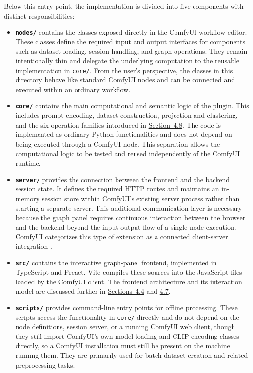 Below this entry point, the implementation is divided into five components with distinct responsibilities:

\begin{itemize}
\item \textbf{\texttt{nodes/}} contains the classes exposed directly in the ComfyUI workflow editor. These classes define the required input and output interfaces for components such as dataset loading, session handling, and graph operations. They remain intentionally thin and delegate the underlying computation to the reusable implementation in \texttt{core/}. From the user's perspective, the classes in this directory behave like standard ComfyUI nodes and can be connected and executed within an ordinary workflow.
\item \textbf{\texttt{core/}} contains the main computational and semantic logic of the plugin. This includes prompt encoding, dataset construction, projection and clustering, and the six operation families introduced in \hyperref[sec:4.8]{Section~4.8}. The code is implemented as ordinary Python functionalities and does not depend on being executed through a ComfyUI node. This separation allows the computational logic to be tested and reused independently of the ComfyUI runtime.
\item \textbf{\texttt{server/}} provides the connection between the frontend and the backend session state. It defines the required HTTP routes and maintains an in-memory session store within ComfyUI's existing server process rather than starting a separate server. This additional communication layer is necessary because the graph panel requires continuous interaction between the browser and the backend beyond the input-output flow of a single node execution. ComfyUI categorizes this type of extension as a connected client-server integration \cite{comfyorg2026overview}.
\item \textbf{\texttt{src/}} contains the interactive graph-panel frontend, implemented in TypeScript and Preact. Vite compiles these sources into the JavaScript files loaded by the ComfyUI client. The frontend architecture and its interaction model are discussed further in \hyperref[sec:4.4]{Sections~4.4} and \hyperref[sec:4.7]{4.7}.
\item \textbf{\texttt{scripts/}} provides command-line entry points for offline processing. These scripts access the functionality in \texttt{core/} directly and do not depend on the node definitions, session server, or a running ComfyUI web client, though they still import ComfyUI's own model-loading and CLIP-encoding classes directly, so a ComfyUI installation must still be present on the machine running them. They are primarily used for batch dataset creation and related preprocessing tasks.
\end{itemize}

